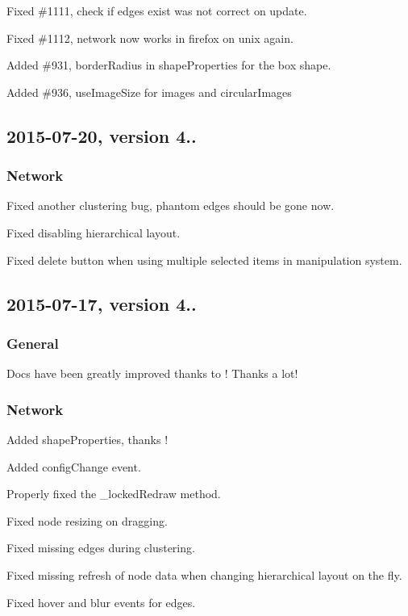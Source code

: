 \begin{DoxyItemize}
\item Fixed \#1111, check if edges exist was not correct on update.
\item Fixed \#1112, network now works in firefox on unix again.
\item Added \#931, border\+Radius in shape\+Properties for the box shape.
\item Added \#936, use\+Image\+Size for images and circular\+Images
\end{DoxyItemize}

\subsection*{2015-\/07-\/20, version 4..}

\subsubsection*{Network}


\begin{DoxyItemize}
\item Fixed another clustering bug, phantom edges should be gone now.
\item Fixed disabling hierarchical layout.
\item Fixed delete button when using multiple selected items in manipulation system.
\end{DoxyItemize}

\subsection*{2015-\/07-\/17, version 4..}

\subsubsection*{General}


\begin{DoxyItemize}
\item Docs have been greatly improved thanks to ! Thanks a lot!
\end{DoxyItemize}

\subsubsection*{Network}


\begin{DoxyItemize}
\item Added shape\+Properties, thanks !
\item Added config\+Change event.
\item Properly fixed the \+\_\+locked\+Redraw method.
\item Fixed node resizing on dragging.
\item Fixed missing edges during clustering.
\item Fixed missing refresh of node data when changing hierarchical layout on the fly.
\item Fixed hover and blur events for edges.
\end{DoxyItemize}

